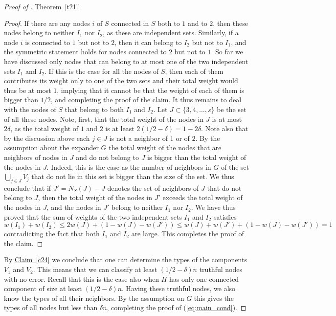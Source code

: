 \documentclass[11pt]{article}
\numberwithin{equation}{section}
\theoremstyle{definition}
\theoremstyle{plain}
\newcommand{\expref}[2]{\hyperref[#2]{#1~\ref{#2}}}
\begin{document}
\begin{proof}[Proof of \expref{Theorem}{t21}]
\begin{proof}
  If there are any nodes $i$ of $S$ connected in $S$ both to $1$
  and to $2$, then these nodes belong to neither $I_1$ nor $I_2$,
  as these are independent sets. Similarly, if a node $i$ is
  connected to $1$ but not to $2$, then it can belong to $I_2$ but not
  to $I_1$, and the symmetric statement holds for nodes connected
  to $2$ but not to $1$. So far we have discussed only nodes that
  can belong to at most one of the two independent sets $I_1$ and
  $I_2$. If this is the case for all the nodes of $S$, then each of
  them contributes its weight only to one of the two sets and their
  total weight would thus be at most $1$, implying that it cannot be
  that the weight of each of them is bigger than $1/2$, and completing
  the proof of the claim. It thus remains to deal with the nodes of
  $S$ that belong to both $I_1$ and $I_2$.  Let
  $J \subset \{3,4, \ldots ,s\}$ be the set of all these nodes.
  Note, first, that the total weight of the nodes in $J$ is at most
  $2 \delta$, as the total weight of $1$ and $2$ is at least
  $2 (1/2-\delta)=1-2 \delta$.  Note also that by the discussion above
  each $j \in J$ is not a neighbor of $1$ or of $2$.  By the
  assumption about the expander $G$ the total weight of the nodes
  that are neighbors of nodes in $J$ and do not belong to $J$ is
  bigger than the total weight of the nodes in $J$.  Indeed, this
  is the case as the number of neighbors in $G$ of the set
  $\bigcup_{j \in J} V_j$ that do not lie in this set is bigger than the
  size of the set. We thus conclude that if $J'=N_S(J)-J$ denotes the
  set of neighbors of $J$ that do not belong to $J$, then the total
  weight of the nodes in $J'$ exceeds the total weight of the
  nodes in $J$, and the nodes in $J'$ belong to neither $I_1$
  nor $I_2$.  We have thus proved that the sum of weights of the two
  independent sets $I_1$ and $I_2$ satisfies
  \[
    w(I_1)+w(I_2) \leq 2 w(J) +(1-w(J)-w(J')) \leq w(J)+w(J')
    +(1-w(J)-w(J')) =1
  \]
  contradicting the fact that both $I_1$ and $I_2$ are large. This
  completes the proof of the claim.
\end{proof}

By \expref{Claim}{c24} we conclude that one can determine the types of
the components $V_1$ and $V_2$. This means that we can classify
at least $(1/2-\delta)n$ truthful nodes with no error. Recall
that this is
the case also when $H$ has only one connected component of size
at least $(1/2-\delta)n$. Having these truthful nodes, we also
know the types of all their neighbors. By the assumption on $G$
this gives the types of all nodes but less than $\delta n$,
completing the proof of (\ref{eq:main_cond}).   
\vspace{0.1cm}


\end{proof}
\end{document}
